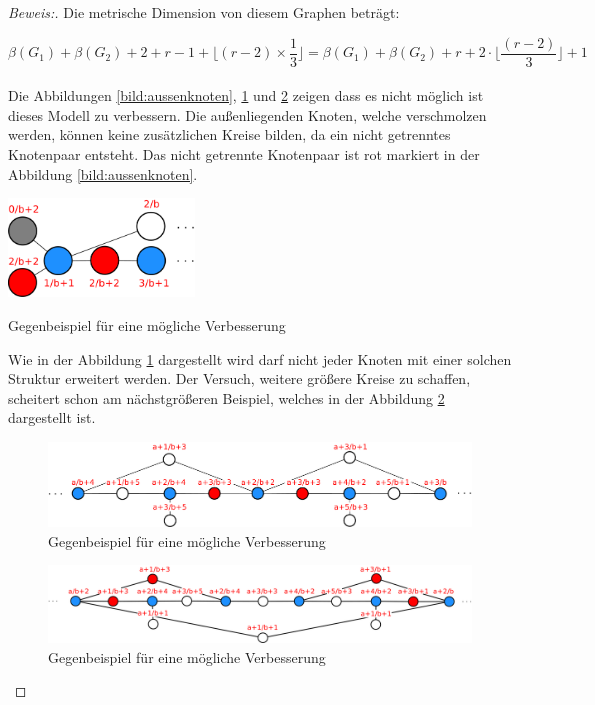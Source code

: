 \begin{proof}[Beweis:]
Die metrische Dimension von diesem Graphen beträgt:

$$ \beta(G_1)+\beta(G_2)+2+r-1+ \lfloor(r-2)\times\frac{1}{3}\rfloor = \beta(G_1)+\beta(G_2)+r+2 \cdot \lfloor\frac{(r-2)}{3}\rfloor+1$$\\
Die Abbildungen \ref{bild:aussenknoten}, \ref{bild:2hintereinander} und \ref{bild:multikreise} zeigen dass es nicht möglich ist dieses Modell zu verbessern. Die außenliegenden Knoten, welche verschmolzen werden, können keine zusätzlichen Kreise bilden, da ein nicht getrenntes Knotenpaar entsteht. Das nicht getrennte Knotenpaar ist rot markiert in der Abbildung \ref{bild:aussenknoten}. 
\begin{floatingfigure}[r]{200pt}
\centering
\includegraphics[width = 140pt]{bilder/gbspver1.pdf}
\caption{Gegenbeispiel für eine mögliche Verbesserung}
\label{bild:aussenknoten}
\end{floatingfigure}
Wie in der Abbildung \ref{bild:2hintereinander} dargestellt wird darf nicht jeder Knoten mit einer solchen Struktur erweitert werden. Der Versuch, weitere größere Kreise zu schaffen, scheitert schon am nächstgrößeren Beispiel, welches in der Abbildung \ref{bild:multikreise} dargestellt ist. 
\par
\vspace{+6mm}
 \begin{figure}[h!]
		\centering 		 
\includegraphics[width=400pt]{bilder/gbspver2.pdf}
   \caption{Gegenbeispiel für eine mögliche Verbesserung}
\label{bild:2hintereinander}  	 
  	 \end{figure}  


 \begin{figure}[h!]
		\centering 		 
\includegraphics[width=400pt]{bilder/gbsp3.pdf}
   \caption{Gegenbeispiel für eine mögliche Verbesserung}
\label{bild:multikreise}  	 
  	 \end{figure} 
\end{proof}
